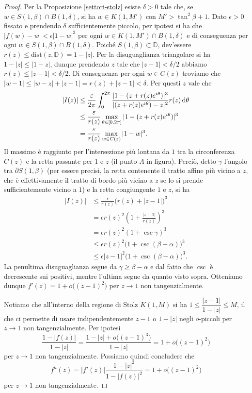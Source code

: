 \begin{proof}
  Per la Proposizione \ref{settori-stolz} esiste $\delta>0$ tale che, se $w \in S(1,\beta) \cap B(1,\delta)$, si ha $w \in K(1,M')$ con $M'>\tan^2\beta+1$.
  Dato $\epsilon>0$ fissato e prendendo $\delta$ sufficientemente piccolo, per ipotesi si ha che $|f(w)-w|<\epsilon|1-w|^3$ per ogni $w \in K(1,M') \cap B(1,\delta)$ e di conseguenza per ogni $w \in S(1,\beta) \cap B(1,\delta)$.
  Poiché $S(1,\beta) \subset \mathbb{D}$, dev'essere $r(z) \le \text{dist}(z,\mathbb{D})=1-|z|$. Per la disuguaglianza triangolare si ha $1-|z| \le |1-z|$, dunque prendendo $z$ tale che $|z-1|<\delta/2$ abbiamo $r(z) \le |z-1|<\delta/2$. Di conseguenza per ogni $w \in C(z)$ troviamo che $|w-1| \le |w-z|+|z-1|=r(z)+|z-1|<\delta$. Per questi $z$ vale che
  \begin{align*}
    |I(z)| & \le \frac{\varepsilon}{2\pi} \int_0^{2\pi} \frac{|1-(z+r(z)e^{i\theta})|^3}{|(z+r(z)e^{i\theta})-z|^2}r(z)\mathop{}\!\mathrm{d}\theta \\
    & \le \frac{\varepsilon}{r(z)}\max_{\theta \in [0,2\pi]} |1-(z+r(z)e^{i\theta})|^3 \\
    & =\frac{\varepsilon}{r(z)}\max_{w \in C(z)}|1-w|^3.
  \end{align*}
  Il massimo è raggiunto per l'intersezione più lontana da $1$ tra la circonferenza $C(z)$ e la retta passante per $1$ e $z$ (il punto $A$ in figura). Perciò, detto $\gamma$ l'angolo tra $\partial S(1,\beta)$ (per essere precisi, la retta contenente il tratto affine più vicino a $z$, che è effettivamente il tratto di bordo più vicino a $z$ se lo si prende sufficientemente vicino a $1$) e la retta congiungente $1$ e $z$, si ha
  \begin{align*}
    |I(z)| & \le \frac{\epsilon}{r(z)}\bigl(r(z)+|z-1|\bigr)^3 \\
    & =\epsilon r(z)^2\left(1+\frac{|z-1|}{r(z)}\right)^3 \\
    & =\epsilon r(z)^2(1+\csc\gamma)^3 \\
    & \le \epsilon r(z)^2\bigl(1+\csc(\beta-\alpha)\bigr)^3 \\
    & \le \epsilon |z-1|^2\bigl(1+\csc(\beta-\alpha)\bigr)^3.
  \end{align*}
  La penultima disuguaglianza segue da $\gamma \ge \beta-\alpha$ e dal fatto che $\csc$ è decrescente sui positivi, mentre l'ultima segue da quanto visto sopra. Otteniamo dunque $f'(z)=1+o\bigl((z-1)^2\bigr)$ per $z \longrightarrow 1$ non tangenzialmente.

  Notiamo che all'interno della regione di Stolz $K(1,M)$ si ha $1 \le \dfrac{|z-1|}{1-|z|} \le M$, il che ci  permette di usare indipendentemente $z-1$ o $1-|z|$ negli $o$-piccoli per $z \longrightarrow 1$ non tangenzialmente. Per ipotesi
  $$\frac{1-|f(z)|}{1-|z|}=\frac{1-|z|+o\bigl((z-1)^3\bigr)}{1-|z|}=1+o\bigl((z-1)^2\bigr)$$
  per $z \longrightarrow 1$ non tangenzialmente. Possiamo quindi concludere che
  $$f^h(z)=|f'(z)|\frac{1-|z|^2}{1-|f(z)|^2}=1+o\bigl((z-1)^2\bigr)$$
  per $z \longrightarrow 1$ non tangenzialmente.
\end{proof}
